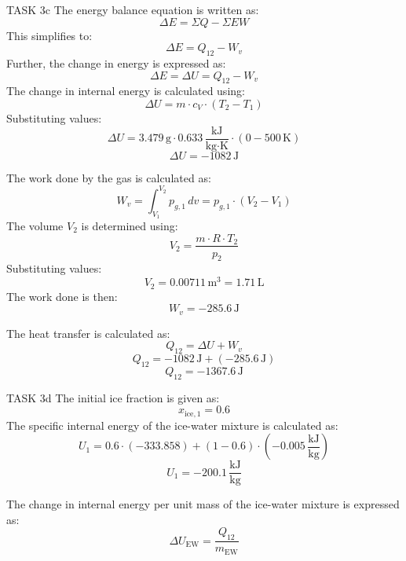 TASK 3c  
The energy balance equation is written as:  
\[
\Delta E = \Sigma Q - \Sigma EW
\]  
This simplifies to:  
\[
\Delta E = Q_{12} - W_v
\]  
Further, the change in energy is expressed as:  
\[
\Delta E = \Delta U = Q_{12} - W_v
\]  
The change in internal energy is calculated using:  
\[
\Delta U = m \cdot c_V \cdot (T_2 - T_1)
\]  
Substituting values:  
\[
\Delta U = 3.479 \, \text{g} \cdot 0.633 \, \frac{\text{kJ}}{\text{kg·K}} \cdot (0 - 500 \, \text{K})
\]  
\[
\Delta U = -1082 \, \text{J}
\]  

The work done by the gas is calculated as:  
\[
W_v = \int_{V_1}^{V_2} p_{g,1} \, dv = p_{g,1} \cdot (V_2 - V_1)
\]  
The volume \( V_2 \) is determined using:  
\[
V_2 = \frac{m \cdot R \cdot T_2}{p_2}
\]  
Substituting values:  
\[
V_2 = 0.00711 \, \text{m}^3 = 1.71 \, \text{L}
\]  
The work done is then:  
\[
W_v = -285.6 \, \text{J}
\]  

The heat transfer is calculated as:  
\[
Q_{12} = \Delta U + W_v
\]  
\[
Q_{12} = -1082 \, \text{J} + (-285.6 \, \text{J})
\]  
\[
Q_{12} = -1367.6 \, \text{J}
\]  

TASK 3d  
The initial ice fraction is given as:  
\[
x_{\text{ice},1} = 0.6
\]  
The specific internal energy of the ice-water mixture is calculated as:  
\[
U_1 = 0.6 \cdot (-333.858) + (1 - 0.6) \cdot (-0.005 \, \frac{\text{kJ}}{\text{kg}})
\]  
\[
U_1 = -200.1 \, \frac{\text{kJ}}{\text{kg}}
\]  

The change in internal energy per unit mass of the ice-water mixture is expressed as:  
\[
\Delta U_{\text{EW}} = \frac{Q_{12}}{m_{\text{EW}}}
\]